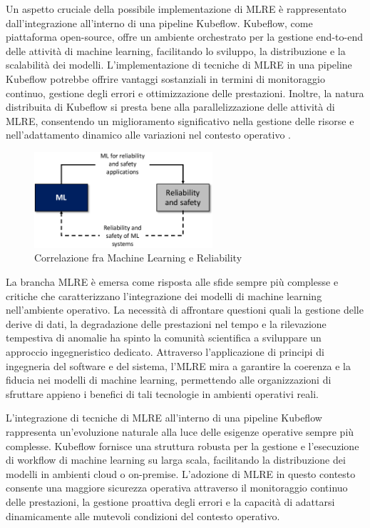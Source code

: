 Un aspetto cruciale della possibile implementazione di MLRE è rappresentato dall'integrazione all'interno di una pipeline Kubeflow. Kubeflow, come piattaforma open-source, offre un ambiente orchestrato per la gestione end-to-end delle attività di machine learning, facilitando lo sviluppo, la distribuzione e la scalabilità dei modelli. L'implementazione di tecniche di MLRE in una pipeline Kubeflow potrebbe offrire vantaggi sostanziali in termini di monitoraggio continuo, gestione degli errori e ottimizzazione delle prestazioni. Inoltre, la natura distribuita di Kubeflow si presta bene alla parallelizzazione delle attività di MLRE, consentendo un miglioramento significativo nella gestione delle risorse e nell'adattamento dinamico alle variazioni nel contesto operativo \cite{Kubeflow_integration}.

\begin{figure}[h]
    \centering
    \includegraphics[width=250px]{figures/ch6/mlre.png}
    \caption[Correlazione fra Machine Learning e Reliability]{Correlazione fra Machine Learning e Reliability}
    \label{fig:cha6:mlre}
\end{figure}

La brancha MLRE è emersa come risposta alle sfide sempre più complesse e critiche che caratterizzano l'integrazione dei modelli di machine learning nell'ambiente operativo. La necessità di affrontare questioni quali la gestione delle derive di dati, la degradazione delle prestazioni nel tempo e la rilevazione tempestiva di anomalie ha spinto la comunità scientifica a sviluppare un approccio ingegneristico dedicato. Attraverso l'applicazione di principi di ingegneria del software e del sistema, l'MLRE mira a garantire la coerenza e la fiducia nei modelli di machine learning, permettendo alle organizzazioni di sfruttare appieno i benefici di tali tecnologie in ambienti operativi reali.

L'integrazione di tecniche di MLRE all'interno di una pipeline Kubeflow rappresenta un'evoluzione naturale alla luce delle esigenze operative sempre più complesse. Kubeflow fornisce una struttura robusta per la gestione e l'esecuzione di workflow di machine learning su larga scala, facilitando la distribuzione dei modelli in ambienti cloud o on-premise. L'adozione di MLRE in questo contesto consente una maggiore sicurezza operativa attraverso il monitoraggio continuo delle prestazioni, la gestione proattiva degli errori e la capacità di adattarsi dinamicamente alle mutevoli condizioni del contesto operativo.

